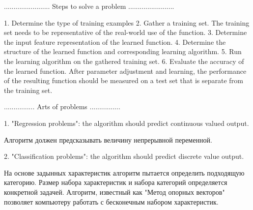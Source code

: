 ........................
Steps to solve a problem
........................

1. Determine the type of training examples
2. Gather a training set. The training set needs to be representative of the real-world use of the function.
3. Determine the input feature representation of the learned function.
4. Determine the structure of the learned function and corresponding learning algorithm.
5. Run the learning algorithm on the gathered training set.
6. Evaluate the accuracy of the learned function. After parameter adjustment and learning, the performance of the resulting function should be measured on a test set that is separate from the training set.

................
Arts of problems
................

1. "Regression problems": the algorithm should predict continuous valued output.
					
	Алгоритм должен предсказывать величину непрерывной переменной. 

2. "Classification problems": the algorithm should predict discrete value output. 

	На основе задынных характеристик алгоритм пытается определить подходящую категорию. Размер набора характеристик и набора категорий определяется конкретной задачей.
	Алгоритм, известный как "Метод опорных векторов" позволяет компьютеру работать с бесконечным набором характеристик.


